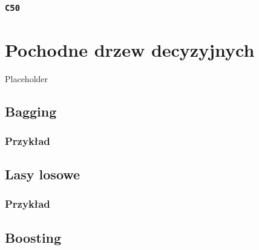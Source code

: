 \documentclass[]{book}
\theoremstyle{plain}
\theoremstyle{definition}
\begin{document}
\hypertarget{c50}{%
\subsection{\texorpdfstring{\texttt{C50}}{C50}}\label{c50}}

\hypertarget{pochodne-drzew-decyzyjnych}{%
\chapter{Pochodne drzew decyzyjnych}\label{pochodne-drzew-decyzyjnych}}

Placeholder

\hypertarget{bagging}{%
\section{Bagging}\label{bagging}}

\hypertarget{przyk51}{%
\subsection{Przykład}\label{przyk51}}

\hypertarget{lasy-losowe}{%
\section{Lasy losowe}\label{lasy-losowe}}

\hypertarget{przyk52}{%
\subsection{Przykład}\label{przyk52}}

\hypertarget{boosting}{%
\section{Boosting}\label{boosting}}


\end{document}
